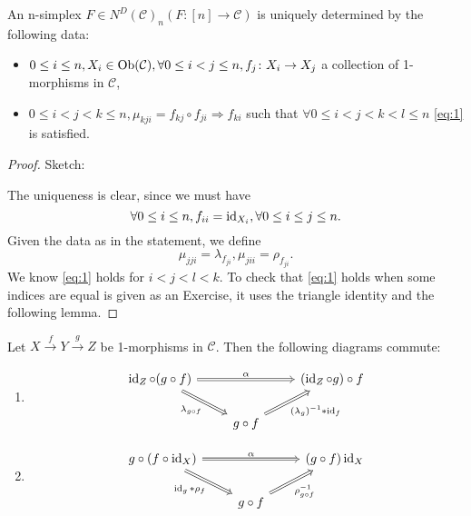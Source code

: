 \begin{prop}
	An n-simplex $ F \in N^D ( \mathcal{ C } )_n ( F \colon [ n ] \to \mathcal{ C } ) $ is uniquely determined by the following data:
	\begin{itemize}
		\item 
		$ 0 \leq i \leq n , X_i \in \operatorname{Ob}( \mathcal{ C } ) , \forall  0 \leq  i < j \leq n, f_j \colon X_i \to X_j $ a collection of 1-morphisms in $ \mathcal{ C } $,
		
		\item 
		$ 0 \leq i < j < k \leq n , \mu_{ k j i } = f_{ k j } \circ f_{ j i } \Rightarrow f_{ k i } $ such that $ \forall 0 \leq i < j < k < l \leq n $ \eqref{eq:1} is satisfied.  
\end{itemize}
\end{prop}

\begin{proof}
	Sketch:
	
	The uniqueness is clear, since we must have 
	\[
		\forall 0 \leq i \leq n , f_{ i i } = \operatorname{id}_{ X_i }, \forall 0 \leq i \leq j \leq n.
	\]
	Given the data as in the statement, we define  
	\[
		\mu_{ j j i } = \lambda_{ f_{ j i } } , \mu_{ j i i } = \rho_{ f_{ j i } }.
	\]
	We know \ref{eq:1} holds for $ i < j < l < k $.
	To check that \ref{eq:1} holds when some indices are equal is given as an Exercise, it uses the triangle identity and the following lemma.
\end{proof}

\begin{lem}		
	Let $ X \xrightarrow{ f } Y \xrightarrow{ g } Z $ be 1-morphisms in $ \mathcal{ C } $.
	Then the following diagrams commute:
	\begin{enumerate}
		\item 
		\[
		\begin{tikzcd}
			\id_Z \circ ( g \circ f ) 
			\ar[rr, Rightarrow, "\alpha"]
			\ar[rd, Rightarrow, "\lambda_{ g \circ f }"' ]
			&&
			( \id_Z \circ g ) \circ f 
			\\
			&
			g \circ f 
			\ar[ru, Rightarrow, " ( \lambda_g)^{ - 1 } * \id_f "']
			&
		\end{tikzcd}
		\]
		
		\item 
		\[
		\begin{tikzcd}	
			g \circ ( f \circ \id_X )
			\ar[rr, Rightarrow, " \alpha " ]
			\ar[rd, Rightarrow, " \id_g * \rho_f "' ]
			&&
			( g \circ f ) \id_X
			\\
			&
			g \circ f 
			\ar[ru, Rightarrow , " \rho_{ g \circ f }^{ - 1 } "' ]
		\end{tikzcd}
		\]
	\end{enumerate}
\end{lem}

